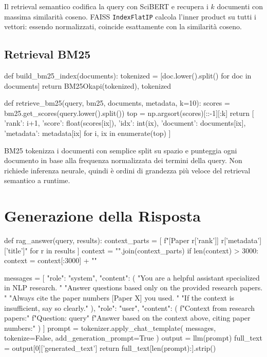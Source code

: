 \documentclass[12pt,a4paper]{article}
\begin{document}
Il retrieval semantico codifica la query con SciBERT e recupera i $k$ documenti con massima similarit\`a coseno. FAISS \texttt{IndexFlatIP} calcola l'inner product su tutti i vettori: essendo normalizzati, coincide esattamente con la similarit\`a coseno.

\subsection{Retrieval BM25}

\begin{pylisting}[title={Costruzione indice BM25 e retrieval lessicale}]
def build_bm25_index(documents):
    tokenized = [doc.lower().split() for doc in documents]
    return BM25Okapi(tokenized), tokenized

def retrieve_bm25(query, bm25, documents, metadata, k=10):
    scores = bm25.get_scores(query.lower().split())
    top    = np.argsort(scores)[::-1][:k]
    return [
        {'rank': i+1, 'score': float(scores[ix]), 'idx': int(ix),
         'document': documents[ix], 'metadata': metadata[ix]}
        for i, ix in enumerate(top)
    ]
\end{pylisting}

BM25 tokenizza i documenti con semplice split su spazio e punteggia ogni documento in base alla frequenza normalizzata dei termini della query. Non richiede inferenza neurale, quindi \`e ordini di grandezza pi\`u veloce del retrieval semantico a runtime.

\section{Generazione della Risposta}

\begin{pylisting}[title={Prompt e generazione con Phi-3.5-mini-instruct}]
def rag_answer(query, results):
    context_parts = [
        f"[Paper {r['rank']}] {r['metadata']['title']}"
        for r in results
    ]
    context = "\n\n".join(context_parts)
    if len(context) > 3000:
        context = context[:3000] + "\n[...truncated...]"

    messages = [
        {"role": "system", "content": (
            "You are a helpful assistant specialized in NLP research. "
            "Answer questions based only on the provided research papers. "
            "Always cite the paper numbers [Paper X] you used. "
            "If the context is insufficient, say so clearly."
        )},
        {"role": "user", "content": (
            f"Context from research papers:\n{}\n\n"
            f"Question: {query}\n\n"
            f"Answer based on the context above, citing paper numbers:"
        )}
    ]
    prompt = tokenizer.apply_chat_template(
        messages, tokenize=False, add_generation_prompt=True
    )
    output    = llm(prompt)
    full_text = output[0]['generated_text']
    return full_text[len(prompt):].strip()
\end{pylisting}
\end{document}
